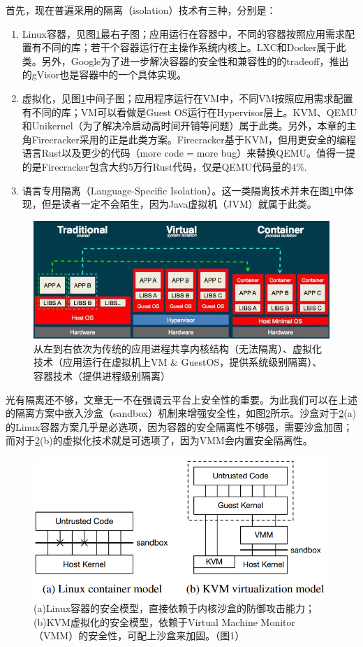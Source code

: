 \documentclass[11pt]{article}
\begin{document}
首先，现在普遍采用的隔离（isolation）技术有三种，分别是\cite{agache2020firecracker}：
\begin{enumerate}
	\item Linux容器，见图\ref{figs:isolation}最右子图；应用运行在容器中，不同的容器按照应用需求配置有不同的库；若干个容器运行在主操作系统内核上。LXC和Docker属于此类。另外，Google为了进一步解决容器的安全性和兼容性的的tradeoff，推出的gVisor也是容器中的一个具体实现。
	\item 虚拟化，见图\ref{figs:isolation}中间子图；应用程序运行在VM中，不同VM按照应用需求配置有不同的库；VM可以看做是Guest OS运行在Hypervisor层上。KVM、QEMU和Unikernel（为了解决冷启动高时间开销等问题）属于此类。另外，本章的主角Firecracker采用的正是此类方案。Firecracker基于KVM，但用更安全的编程语言Rust以及更少的代码（more code$ = $more bug）来替换QEMU。值得一提的是Firecracker包含大约5万行Rust代码，仅是QEMU代码量的4\%.
	\item 语言专用隔离（Language-Specific Isolation）。这一类隔离技术并未在图\ref{figs:isolation}中体现，但是读者一定不会陌生，因为Java虚拟机（JVM）就属于此类。
\end{enumerate}
\begin{figure}[!htbp]
	\centering
	\includegraphics[width=0.8\linewidth]{figs/isolation}
	\caption{从左到右依次为传统的应用进程共享内核结构（无法隔离）、虚拟化技术（应用运行在虚拟机上VM \& GuestOS，提供系统级别隔离）、容器技术（提供进程级别隔离）}
	\label{figs:isolation}
\end{figure}
光有隔离还不够，文章\cite{hellerstein2018serverless,jonas2019cloud}无一不在强调云平台上安全性的重要。为此我们可以在上述的隔离方案中嵌入沙盒（sandbox）机制来增强安全性，如图\ref{figs:sandbox}所示。沙盒对于\ref{figs:sandbox}(a)的Linux容器方案几乎是必选项，因为容器的安全隔离性不够强，需要沙盒加固；而对于\ref{figs:sandbox}(b)的虚拟化技术就是可选项了，因为VMM会内置安全隔离性。
\begin{figure}[!htbp]
	\centering
	\includegraphics[width=0.5\linewidth]{figs/sandbox}
	\caption{(a)Linux容器的安全模型，直接依赖于内核沙盒的防御攻击能力；(b)KVM虚拟化的安全模型，依赖于Virtual Machine Monitor（VMM）的安全性，可配上沙盒来加固。（\cite{agache2020firecracker}图1）}
	\label{figs:sandbox}
\end{figure}
\end{document}
